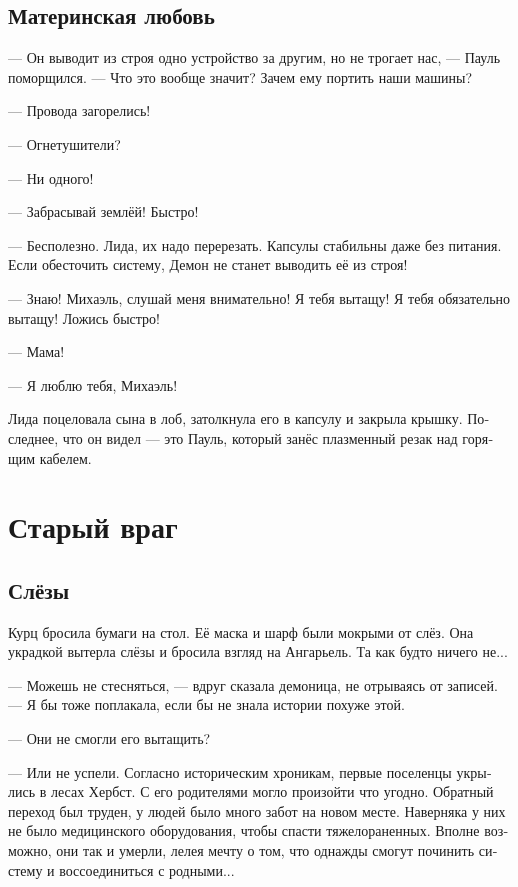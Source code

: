 \documentclass[a4paper,12pt,fleqn]{book}\usepackage{cooltooltips}\usepackage{polyglossia}\setdefaultlanguage[babelshorthands=true]{russian}\setotherlanguage{english}\defaultfontfeatures{Ligatures=TeX,Mapping=tex-text} \usepackage{xcolor}\definecolor{lightgray}{HTML}{bbbbbb}\color{lightgray}\newcommand{\ml}[3]{\textenglish{\textcolor{black}{#3}}}
\newcommand{\asterism}{\vspace{1em}{\centering\Large\bfseries$\ast~\ast~\ast$\par}\vspace{1em}}
\begin{document}
\section{Материнская любовь}

--- Он выводит из строя одно устройство за другим, но не трогает нас, --- Пауль поморщился.
--- Что это вообще значит?
Зачем ему портить наши машины?

\asterism

--- Провода загорелись!

--- Огнетушители?

--- Ни одного!

--- Забрасывай землёй!
Быстро!

--- Бесполезно.
Лида, их надо перерезать.
Капсулы стабильны даже без питания.
Если обесточить систему, Демон не станет выводить её из строя!

--- Знаю!
Михаэль, слушай меня внимательно!
Я тебя вытащу!
Я тебя обязательно вытащу!
Ложись быстро!

--- Мама!

--- Я люблю тебя, Михаэль!

Лида поцеловала сына в лоб, затолкнула его в капсулу и закрыла крышку.
Последнее, что он видел --- это Пауль, который занёс плазменный резак над горящим кабелем.

\chapter{Старый враг}

\section{Слёзы}

Курц бросила бумаги на стол.
Её маска и шарф были мокрыми от слёз.
Она украдкой вытерла слёзы и бросила взгляд на Ангарьель.
Та как будто ничего не...

--- Можешь не стесняться, --- вдруг сказала демоница, не отрываясь от записей.
--- Я бы тоже поплакала, если бы не знала истории похуже этой.

--- Они не смогли его вытащить?

--- Или не успели.
Согласно историческим хроникам, первые поселенцы укрылись в лесах Хербст.
С его родителями могло произойти что угодно.
Обратный переход был труден, у людей было много забот на новом месте.
Наверняка у них не было медицинского оборудования, чтобы спасти тяжелораненных.
Вполне возможно, они так и умерли, лелея мечту о том, что однажды смогут починить систему и воссоединиться с родными...
\end{document}
